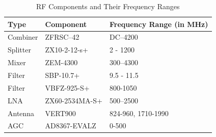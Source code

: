 \documentclass[conference]{IEEEtran}
\begin{document}












\begin{table}[h]
\centering
\caption{RF Components and Their Frequency Ranges}
\begin{tabular}{|l|l|l|}
\hline
\textbf{Type}      & \textbf{Component}        & \textbf{Frequency Range (in MHz)}                  \\ \hline
Combiner  & ZFRSC–42                  & DC–4200                                \\ \hline
Splitter  & ZX10-2-12-s+                 & 2 - 1200                                \\ \hline

Mixer              & ZEM-4300                  & 300–4300                               \\ \hline
Filter             & SBP-10.7+          & 9.5 - 11.5       \\ \hline
Filter             & VBFZ-925-S+
          & 800-1050       \\ \hline
LNA                & ZX60-2534MA-S+                   & 500–2500                                \\ \hline
Antenna            & VERT900             & 824-960, 1710-1990                                           \\ \hline
AGC            & AD8367-EVALZ
             &   0-500                                         \\ \hline
\end{tabular}
\label{tab:components}
\end{table}
\end{document}
